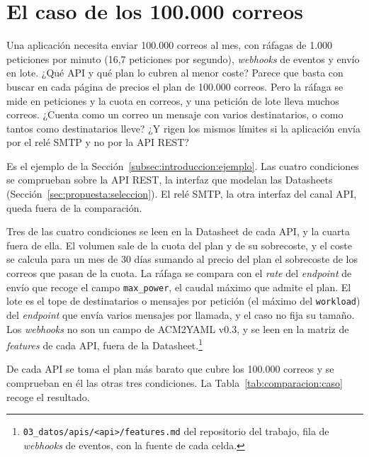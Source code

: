 \section{El caso de los 100.000 correos}\label{sec:comparacion:caso}

Una aplicación necesita enviar 100.000 correos al mes, con ráfagas de 1.000 peticiones por minuto (16,7 peticiones por segundo), \textit{webhooks} de eventos y envío en lote.
¿Qué API y qué plan lo cubren al menor coste?
Parece que basta con buscar en cada página de precios el plan de 100.000 correos.
Pero la ráfaga se mide en peticiones y la cuota en correos, y una petición de lote lleva muchos correos.
¿Cuenta como un correo un mensaje con varios destinatarios, o como tantos como destinatarios lleve?
¿Y rigen los mismos límites si la aplicación envía por el relé SMTP y no por la API REST?

Es el ejemplo de la Sección~\ref{subsec:introduccion:ejemplo}.
Las cuatro condiciones se comprueban sobre la API REST, la interfaz que modelan las Datasheets (Sección~\ref{sec:propuesta:seleccion}).
El relé SMTP, la otra interfaz del canal API, queda fuera de la comparación.

Tres de las cuatro condiciones se leen en la Datasheet de cada API, y la cuarta fuera de ella.
El volumen sale de la cuota del plan y de su sobrecoste, y el coste se calcula para un mes de 30 días sumando al precio del plan el sobrecoste de los correos que pasan de la cuota.
La ráfaga se compara con el \textit{rate} del \textit{endpoint} de envío que recoge el campo \texttt{max\_power}, el caudal máximo que admite el plan.
El lote es el tope de destinatarios o mensajes por petición (el máximo del \texttt{workload}) del \textit{endpoint} que envía varios mensajes por llamada, y el caso no fija su tamaño.
Los \textit{webhooks} no son un campo de ACM2YAML v0.3, y se leen en la matriz de \textit{features} de cada API, fuera de la Datasheet.\footnote{\texttt{03\_datos/apis/<api>/features.md} del repositorio del trabajo, fila de \textit{webhooks} de eventos, con la fuente de cada celda.}

De cada API se toma el plan más barato que cubre los 100.000 correos y se comprueban en él las otras tres condiciones.
La Tabla~\ref{tab:comparacion:caso} recoge el resultado.


